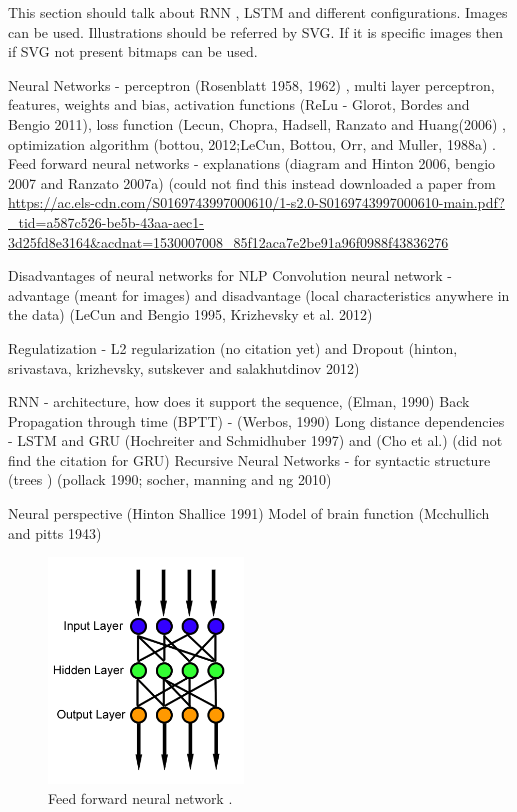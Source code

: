 \documentclass[a4paper, 11pt]{article}
\begin{document}
This section should talk about RNN , LSTM and different configurations. 
Images can be used. Illustrations should be referred by SVG. If it is specific images then if SVG not present bitmaps can be used.

Neural Networks - perceptron \cite{Rosenblatt1958} (Rosenblatt 1958, 1962) , multi layer perceptron, features, weights and bias, activation functions (ReLu - Glorot, Bordes and Bengio 2011), loss function (Lecun, Chopra, Hadsell, Ranzato and Huang(2006) \cite{Lecun2006}, optimization algorithm (bottou, 2012;LeCun, Bottou, Orr, and Muller, 1988a) \cite{Bottou2012}.
Feed forward neural networks - explanations (diagram and Hinton 2006, bengio 2007 and Ranzato 2007a) (could not find this instead downloaded a paper from 
\url{https://ac.els-cdn.com/S0169743997000610/1-s2.0-S0169743997000610-main.pdf?_tid=a587c526-be5b-43aa-aec1-3d25fd8e3164&acdnat=1530007008_85f12aca7e2be91a96f0988f43836276} \cite{Svozil1997}

Disadvantages of neural networks for NLP
Convolution neural network - advantage (meant for images) and disadvantage (local characteristics anywhere in the data) (LeCun and Bengio 1995, Krizhevsky et al. 2012) \cite{Bengio1997} \cite{Krizhevsky}

Regulatization - L2 regularization (no citation yet) and Dropout (hinton, srivastava, krizhevsky, sutskever and salakhutdinov 2012) \cite{Hinton2012}


RNN - architecture, how does it support the sequence, (Elman, 1990) \cite{Elman}
Back Propagation through time (BPTT) - (Werbos, 1990) \cite{Werbos1990}
Long distance dependencies - LSTM and GRU (Hochreiter and Schmidhuber 1997) and (Cho et al.)
(did not find the citation for GRU) \cite{Hochreiter1997}
Recursive Neural Networks - for syntactic structure (trees ) (pollack 1990; socher, manning and ng 2010) \cite{Pollack1990} \cite{Socher}

\color{black}

Neural perspective (Hinton Shallice 1991)
Model of brain function (Mcchullich and pitts 1943)

\begin{figure}[htpb]
    \centering
    \includegraphics[height=6cm,keepaspectratio=true]
    {Feed_forward_neural_net.png}
    \caption{
        Feed forward neural network \cite{WikipediaEN_FeedForward_Network}.
    }
    \label{fig:Feed forward neural network}
\end{figure}
\end{document}
